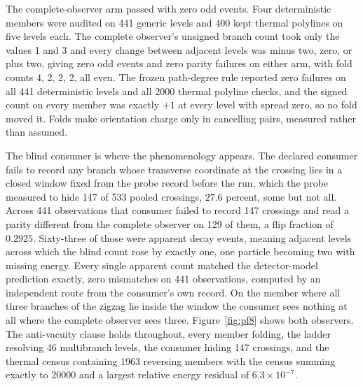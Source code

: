 \documentclass[aps,pre,reprint,nofootinbib,floatfix]{revtex4-2}
\begin{document}
The complete-observer arm passed with zero odd events.  Four
deterministic members were audited on 441 generic levels and 400 kept
thermal polylines on five levels each.  The complete observer's
unsigned branch count took only the values 1 and 3 and every change
between adjacent levels was minus two, zero, or plus two, giving zero
odd events and zero parity failures on either arm, with fold counts 4,
2, 2, 2, all even.  The frozen path-degree rule reported zero failures
on all 441 deterministic levels and all 2000 thermal polyline checks,
and the signed count on every member was exactly $+1$ at every level
with spread zero, so no fold moved it.  Folds make orientation charge
only in cancelling pairs, measured rather than assumed.

The blind consumer is where the phenomenology appears.  The declared
consumer fails to record any branch whose transverse coordinate at the
crossing lies in a closed window fixed from the probe record before the
run, which the probe measured to hide 147 of 533 pooled crossings,
$27.6$ percent, some but not all.  Across 441 observations that
consumer failed to record 147 crossings and read a parity different
from the complete observer on 129 of them, a flip fraction of
$0.2925$.  Sixty-three of those were apparent decay events, meaning
adjacent levels across which the blind count rose by exactly one, one
particle becoming two with missing energy.  Every single apparent count
matched the detector-model prediction exactly, zero mismatches on 441
observations, computed by an independent route from the consumer's own
record.  On the member where all three branches of the zigzag lie
inside the window the consumer sees nothing at all where the complete
observer sees three.  Figure~\ref{fig:pf8} shows both observers.
The anti-vacuity clause holds throughout, every member folding, the
ladder resolving 46 multibranch levels, the consumer hiding 147
crossings, and the thermal census containing 1963 reversing members
with the census summing exactly to 20000 and a largest relative energy
residual of $6.3 \times 10^{-7}$.
\end{document}
